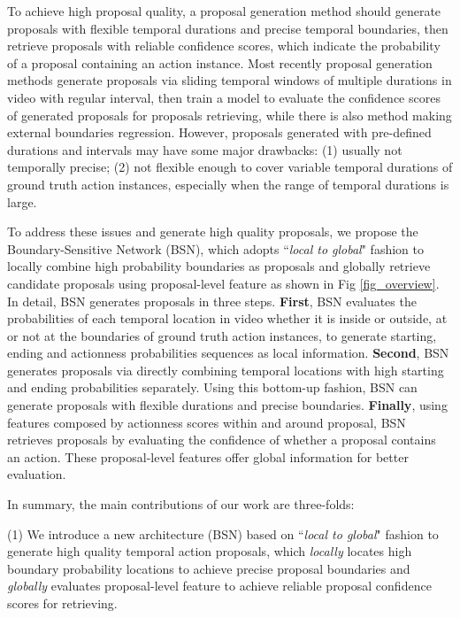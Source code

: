 \documentclass[runningheads]{llncs}
\begin{document}
To achieve high proposal quality, a proposal generation method should generate proposals with flexible temporal durations and precise temporal boundaries, then retrieve  proposals with reliable confidence scores, which indicate the probability of  a proposal containing an action instance.
Most recently proposal generation methods \cite{sst_buch_cvpr17,fast_temporal_activity_cvpr16,escorcia2016daps,shou2016action} generate proposals via sliding temporal windows of multiple durations in video with regular interval, then train a model to evaluate the confidence scores of generated proposals for proposals retrieving, while there is also method \cite{gao2017turn} making external boundaries regression.
However, proposals generated with pre-defined durations and intervals may have some major drawbacks: (1) usually not temporally precise; (2) not flexible enough to cover variable temporal durations of ground truth action instances, especially when the range of temporal durations is large.



To address these issues and generate high quality proposals, we propose the  Boundary-Sensitive Network (BSN), which adopts ``\emph{local to global}" fashion to locally combine high probability boundaries as proposals and globally retrieve candidate proposals using proposal-level feature as shown in Fig \ref{fig_overview}.
In detail, BSN generates proposals in three steps.
{\bf First}, BSN evaluates the probabilities of each temporal location in video whether it is inside or outside, at or not at the boundaries of ground truth action instances, to generate starting, ending and actionness probabilities sequences as local information.
{\bf Second}, BSN generates proposals via directly  combining temporal locations with high starting and ending probabilities separately. Using this bottom-up fashion, BSN can generate proposals with flexible durations and precise boundaries.
{\bf Finally}, using features composed by actionness scores within and around proposal, BSN retrieves proposals by evaluating the confidence of whether a proposal contains an action.  These proposal-level features offer global information for better evaluation.



In summary, the main contributions of our work are three-folds:


(1) We introduce a new architecture (BSN) based on ``\emph{local to global}" fashion to generate high quality temporal action proposals, which \emph{locally} locates high boundary probability locations to achieve precise proposal boundaries and \emph{globally} evaluates proposal-level feature to achieve reliable proposal confidence scores for retrieving.
\end{document}
